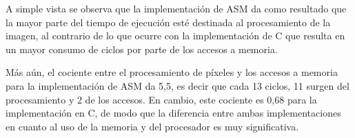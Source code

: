 \par{A simple vista se observa que la implementación de ASM da como resultado que la mayor parte del tiempo de ejecución esté destinada al procesamiento de la imagen, al contrario de lo que ocurre con la implementación de C que resulta en un mayor consumo de ciclos por parte de los accesos a memoria.}
\par{Más aún, el cociente entre el procesamiento de píxeles y los accesos a memoria para la implementación de ASM da 5,5, es decir que cada 13 ciclos, 11 surgen del procesamiento y 2 de los accesos. En cambio, este cociente es 0,68 para la implementación en C, de modo que la diferencia entre ambas implementaciones en cuanto al uso de la memoria y del procesador es muy significativa.}